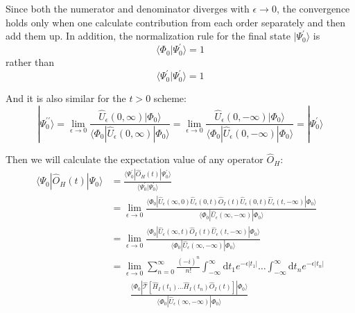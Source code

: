Since both the numerator and denominator diverges with $\epsilon \rightarrow 0$, the convergence holds only when one calculate contribution from each order separately and then add them up.
In addition, the normalization rule for the final state $| \Psi_{0}^{\prime}\rangle$ is 
\begin{equation}
\langle\Phi_{0} | \Psi_{0}^{\prime}\rangle= 1
\end{equation}
rather than
\begin{equation}
\langle\Psi_{0}^{\prime} | \Psi_{0}^{\prime}\rangle= 1
\end{equation}

And it is also similar for the $t>0$ scheme:
\begin{equation}
| \Psi_{0}^{\prime \prime} \rangle=\lim _{\epsilon \rightarrow 0} \frac{\hat{U}_{\epsilon}(0, \infty) | \Phi_{0} \rangle}{\langle\Phi_{0}|\hat{U}_{\epsilon}(0, \infty)| \Phi_{0}\rangle}=\lim _{\epsilon \rightarrow 0} \frac{\hat{U}_{\epsilon}(0,-\infty) | \Phi_{0} \rangle}{\langle\Phi_{0}|\hat{U}_{\epsilon}(0,-\infty)| \Phi_{0}\rangle}=| \Psi_{0}^{\prime} \rangle
\end{equation}

Then we will calculate the expectation value of any operator $\hat{O}_H$:
\begin{equation}
\begin{aligned}
	\langle\Psi_{0}|\hat{O}_{H}(t)| \Psi_{0}\rangle 
	&=\frac{\langle\Psi_{0}^{\prime}|\hat{O}_{H}(t)| \Psi_{0}^{\prime}\rangle}
	{\langle\Psi_{0}^{\prime} | \Psi_{0}^{\prime}\rangle}
	\\
	&=\lim _{\epsilon \rightarrow 0} 
	\frac{\langle\Phi_{0}|\hat{U}_{\epsilon}(\infty, 0)\hat{U}_{\epsilon}(0, t) \hat{O}_{I}(t) \hat{U}_{\epsilon}(0, t)\hat{U}_{\epsilon}(t,-\infty)| \Phi_{0}\rangle}
	{\langle\Phi_{0}|\hat{U}_{\epsilon}(\infty,-\infty)| \Phi_{0}\rangle}
	\\
	&=\lim _{\epsilon \rightarrow 0} 
	\frac{\langle\Phi_{0}|\hat{U}_{\epsilon}(\infty, t) \hat{O}_{I}(t) \hat{U}_{\epsilon}(t,-\infty)| \Phi_{0}\rangle}
	{\langle\Phi_{0}|\hat{U}_{\epsilon}(\infty,-\infty)| \Phi_{0}\rangle}
	\\
	&=\lim _{\epsilon \rightarrow 0} \sum_{n=0}^{\infty} \frac{(-i)^{n}}{n !} \int_{-\infty}^{\infty} \mathrm{d} t_{1} e^{-\epsilon|t_{1}|} \ldots \int_{-\infty}^{\infty} \mathrm{d} t_{n} e^{-\epsilon|t_{n}|}
	\\
	&\qquad \frac{\langle\Phi_{0}|
	\hat{\mathcal{T}}\left[\hat{H}_{I}\left(t_{1}\right) \ldots \hat{H}_{I}\left(t_{n}\right) \hat{O}_{I}(t)\right]|
	\Phi_{0}\rangle}
	{\langle\Phi_{0}|\hat{U}_{\epsilon}(\infty,-\infty)| \Phi_{0}\rangle}
\end{aligned}
\end{equation}

